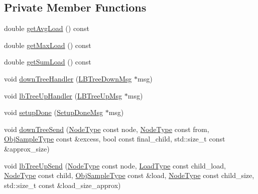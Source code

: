 \subsection*{Private Member Functions}
\begin{DoxyCompactItemize}
\item 
double \hyperlink{structvt_1_1vrt_1_1collection_1_1lb_1_1_hierarchical_l_b_a2fced8b5bbeeef2c150e66146cc77961}{get\+Avg\+Load} () const
\item 
double \hyperlink{structvt_1_1vrt_1_1collection_1_1lb_1_1_hierarchical_l_b_a32428a4c65c820d846e398270578d986}{get\+Max\+Load} () const
\item 
double \hyperlink{structvt_1_1vrt_1_1collection_1_1lb_1_1_hierarchical_l_b_a4cdebd4215afd2cac890525c7901f4ad}{get\+Sum\+Load} () const
\item 
void \hyperlink{structvt_1_1vrt_1_1collection_1_1lb_1_1_hierarchical_l_b_aa5e027cba0dfc9a1c7bc710e9932647a}{down\+Tree\+Handler} (\hyperlink{structvt_1_1vrt_1_1collection_1_1lb_1_1_l_b_tree_down_msg}{L\+B\+Tree\+Down\+Msg} $\ast$msg)
\item 
void \hyperlink{structvt_1_1vrt_1_1collection_1_1lb_1_1_hierarchical_l_b_a3b67d27c10a6a7532c9c5d1a57ab722a}{lb\+Tree\+Up\+Handler} (\hyperlink{structvt_1_1vrt_1_1collection_1_1lb_1_1_l_b_tree_up_msg}{L\+B\+Tree\+Up\+Msg} $\ast$msg)
\item 
void \hyperlink{structvt_1_1vrt_1_1collection_1_1lb_1_1_hierarchical_l_b_a52d7059862182d11f3fcb9683f7ac4a4}{setup\+Done} (\hyperlink{structvt_1_1vrt_1_1collection_1_1lb_1_1_setup_done_msg}{Setup\+Done\+Msg} $\ast$msg)
\item 
void \hyperlink{structvt_1_1vrt_1_1collection_1_1lb_1_1_hierarchical_l_b_aff832357cbb81dc17578c9f8876b7ecf}{down\+Tree\+Send} (\hyperlink{namespacevt_a866da9d0efc19c0a1ce79e9e492f47e2}{Node\+Type} const node, \hyperlink{namespacevt_a866da9d0efc19c0a1ce79e9e492f47e2}{Node\+Type} const from, \hyperlink{structvt_1_1vrt_1_1collection_1_1lb_1_1_base_l_b_a331d7da5bbf2883238427d86b54ddd7b}{Obj\+Sample\+Type} const \&excess, bool const final\+\_\+child, std\+::size\+\_\+t const \&approx\+\_\+size)
\item 
void \hyperlink{structvt_1_1vrt_1_1collection_1_1lb_1_1_hierarchical_l_b_a713887ab6f0cd72df36f05f756ae245d}{lb\+Tree\+Up\+Send} (\hyperlink{namespacevt_a866da9d0efc19c0a1ce79e9e492f47e2}{Node\+Type} const node, \hyperlink{structvt_1_1vrt_1_1collection_1_1lb_1_1_base_l_b_a215e22b9f12678303f49615ae3be05cc}{Load\+Type} const child\+\_\+load, \hyperlink{namespacevt_a866da9d0efc19c0a1ce79e9e492f47e2}{Node\+Type} const child, \hyperlink{structvt_1_1vrt_1_1collection_1_1lb_1_1_base_l_b_a331d7da5bbf2883238427d86b54ddd7b}{Obj\+Sample\+Type} const \&load, \hyperlink{namespacevt_a866da9d0efc19c0a1ce79e9e492f47e2}{Node\+Type} const child\+\_\+size, std\+::size\+\_\+t const \&load\+\_\+size\+\_\+approx)

\end{DoxyCompactItemize}
